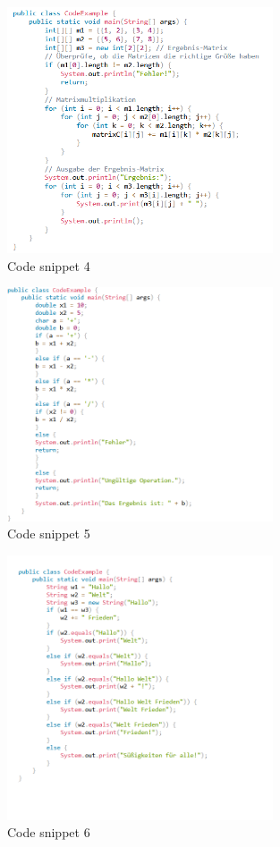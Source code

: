 \begin{figure}[H]
    \centering
    \includegraphics[width=0.7\textwidth]{figures/m.png}
    \caption{Code snippet 4}
    \label{fig:appendix-example}
\end{figure}

\begin{figure}[H]
    \centering
    \includegraphics[width=0.7\textwidth]{figures/rechner.png}
    \caption{Code snippet 5}
    \label{fig:appendix-example}
\end{figure}

\begin{figure}[H]
    \centering
    \includegraphics[width=0.7\textwidth]{figures/hello.png}
    \caption{Code snippet 6}
    \label{fig:appendix-example}
\end{figure}

